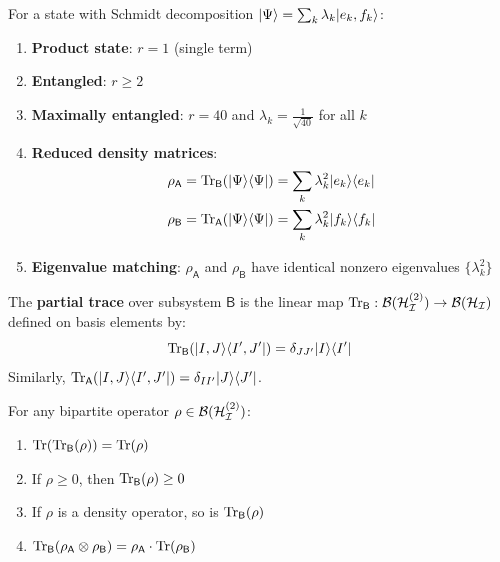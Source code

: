 \begin{corollary}
\label{cor:schmidt-properties}
For a state with Schmidt decomposition $|\Psi\rangle = \sum_k \lambda_k |e_k, f_k\rangle$:
\begin{enumerate}
  \item \textbf{Product state}: $r = 1$ (single term)
  \item \textbf{Entangled}: $r \geq 2$
  \item \textbf{Maximally entangled}: $r = 40$ and $\lambda_k = \frac{1}{\sqrt{40}}$ for all $k$
  \item \textbf{Reduced density matrices}:
  \begin{align}
  \rho_\mathsf{A} &= \mathrm{Tr}_\mathsf{B}(|\Psi\rangle\langle \Psi|) = \sum_k \lambda_k^2 |e_k\rangle\langle e_k| \\
  \rho_\mathsf{B} &= \mathrm{Tr}_\mathsf{A}(|\Psi\rangle\langle \Psi|) = \sum_k \lambda_k^2 |f_k\rangle\langle f_k|
  \end{align}
  \item \textbf{Eigenvalue matching}: $\rho_\mathsf{A}$ and $\rho_\mathsf{B}$ have identical nonzero eigenvalues $\{\lambda_k^2\}$
\end{enumerate}
\end{corollary}

\begin{definition}
\label{def:partial-trace}
The \textbf{partial trace} over subsystem $\mathsf{B}$ is the linear map $\mathrm{Tr}_\mathsf{B} : \mathcal{B}(\mathcal{H}_{\mathcal{I}}^{(2)}) \to \mathcal{B}(\mathcal{H}_{\mathcal{I}})$ defined on basis elements by:
\[
\mathrm{Tr}_\mathsf{B}(|I, J\rangle\langle I', J'|) = \delta_{JJ'} |I\rangle\langle I'|
\]
Similarly, $\mathrm{Tr}_\mathsf{A}(|I, J\rangle\langle I', J'|) = \delta_{II'} |J\rangle\langle J'|$.
\end{definition}

\begin{proposition}
\label{prop:partial-trace}
For any bipartite operator $\rho \in \mathcal{B}(\mathcal{H}_{\mathcal{I}}^{(2)})$:
\begin{enumerate}
  \item $\mathrm{Tr}(\mathrm{Tr}_\mathsf{B}(\rho)) = \mathrm{Tr}(\rho)$
  \item If $\rho \geq 0$, then $\mathrm{Tr}_\mathsf{B}(\rho) \geq 0$
  \item If $\rho$ is a density operator, so is $\mathrm{Tr}_\mathsf{B}(\rho)$
  \item $\mathrm{Tr}_\mathsf{B}(\rho_\mathsf{A} \otimes \rho_\mathsf{B}) = \rho_\mathsf{A} \cdot \mathrm{Tr}(\rho_\mathsf{B})$
\end{enumerate}
\end{proposition}

